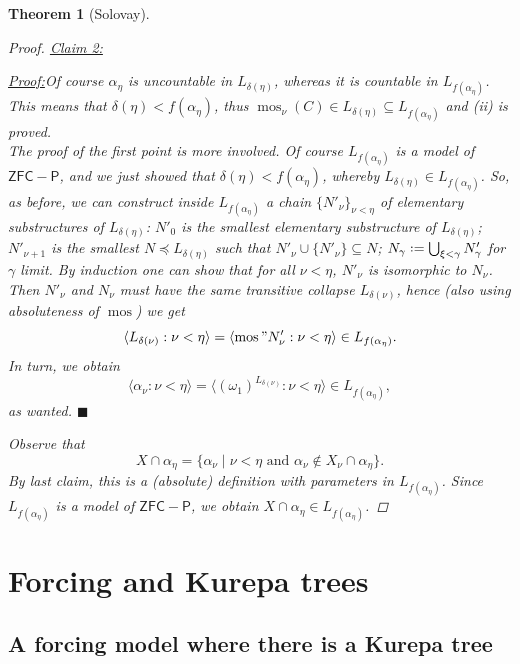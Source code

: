 \documentclass[11pt,a4paper]{report}
\newtheorem{theorem}{Theorem}[chapter] %
\theoremstyle{definition}
\theoremstyle{num.custom-title}
\theoremstyle{custom-title}
\newenvironment{claim}[1]{\par\noindent\underline{Claim#1:}\space}{} %
\newenvironment{claimproof}[1]{\par\noindent\underline{Proof:}\space#1}{\leavevmode\unskip\penalty9999 \hbox{}\nobreak\hfill\quad\hbox{$\blacksquare$}} %
\DeclareMathOperator{\sse}{\subseteq}
\DeclareMathOperator{\mos}{mos}
\newcommand*{\defeq}{\mathrel{\rlap{%
                     \raisebox{0.3ex}{$\cdot$}}%
                     \raisebox{-0.3ex}{$\cdot$}}%
                     =}
\begin{document}
\begin{theorem}[Solovay]
\begin{proof}
\begin{claim}{ 2}
\begin{claimproof}
Of course $\alpha_\eta$ is uncountable in $L_{\delta(\eta)}$, whereas it is countable in $L_{f(\alpha_\eta)}$. This means that $\delta(\eta) < f(\alpha_\eta)$, thus $\mos_\nu(C) \in L_{\delta(\eta)} \sse L_{f(\alpha_\eta)}$ and (ii) is proved.\\[6pt]
%
\indent The proof of the first point is more involved. Of course $L_{f(\alpha_\eta)}$ is a model of $\mathsf{ZFC-P}$, and we just showed that $\delta(\eta) < f(\alpha_\eta)$, whereby $L_{\delta(\eta)} \in L_{f(\alpha_\eta)}$. So, as before, we can construct inside $L_{f(\alpha_\eta)}$ a chain $\{N'_\nu\}_{\nu < \eta}$ of elementary substructures of $L_{\delta(\eta)}$: $N'_0$ is the smallest elementary substructure of $L_{\delta(\eta)}$; $N'_{\nu+1}$ is the smallest $N \preceq L_{\delta(\eta)}$ such that $N'_\nu \cup \{N'_\nu\} \sse N$; $N_\gamma \defeq \bigcup_{\xi < \gamma} N'_\gamma$ for $\gamma$ limit. By induction one can show that for all $\nu < \eta$, $N'_\nu$ is isomorphic to $N_\nu$. Then $N'_\nu$ and $N_\nu$ must have the same transitive collapse $L_{\delta(\nu)}$, hence (also using absoluteness of $\mos$) we get 
\[
\langle L_{\delta(\nu)} : \nu < \eta \rangle = \langle \mos "N'_\nu : \nu < \eta \rangle \in L_{f(\alpha_\eta)}.
\]
In turn, we obtain
\[
\langle \alpha_\nu : \nu < \eta \rangle = \langle (\omega_1)^{L_{\delta(\nu)}} : \nu < \eta \rangle \in L_{f(\alpha_\eta)},
\]
as wanted.
\end{claimproof}
\end{claim}










Observe that
\[
X \cap \alpha_\eta = \{ \alpha_\nu \mid \nu < \eta \text{ and } \alpha_\nu \not\in X_\nu \cap \alpha_\eta \}.
\]
By last claim, this is a (absolute) definition with parameters in $L_{f(\alpha_\eta)}$. Since $L_{f(\alpha_\eta)}$ is a model of $\mathsf{ZFC-P}$, we obtain $X \cap \alpha_\eta \in L_{f(\alpha_\eta)}$.
\end{proof}
\end{theorem}


\section{Forcing and Kurepa trees}

\subsection{A forcing model where there is a Kurepa tree}
\end{document}
